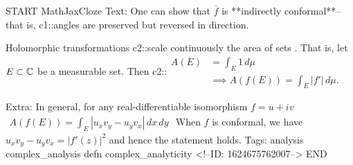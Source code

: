 \documentclass{memoir}
\begin{document}
\begin{anki}
START
MathJaxCloze
Text: One can show that \(\overline{f}\) is **indirectly conformal**-- that is, {{c1::angles are preserved but reversed in direction}}. 

Holomorphic transformations {{c2::scale continuously the area of sets}} . That is, let \(E\subset \mathbb{C}\) be a measurable set. Then
 {{c2::\(\begin{align*}
        	A(E) &= \int_{E} 1 \,d \mu \\
        	     &\implies A(f(E)) = \int_E \left| f' \right| \,d \mu .
        \end{align*}\)}} 

Extra: In general, for any real-differentiable isomorphism \(f = u+iv\)
\(\begin{align*}
  	A(f(E)) = \int_E \left| u_x v_y - u_y v_x \right| \,d x \,d y
  \end{align*}\)
When \(f\) is conformal, we have \(u_xv_y - u_yv_x = \left| f'(z) \right|^2\) and hence the statement holds.
Tags: analysis complex_analysis defn complex_analyticity
<!--ID: 1624675762007-->
END
\end{anki}
\end{document}
